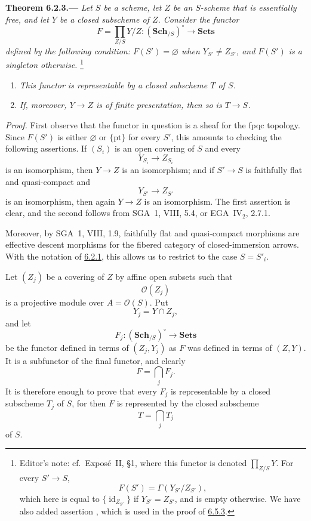 
\medskip
{}\label{thm:sga3-VIB-6.2.3}%
\noindent\textbf{Theorem 6.2.3.---}
\emph{Let \(S\) be a scheme, let \(Z\) be an \(S\)-scheme that
is essentially free, and let \(Y\) be a closed subscheme of
\(Z\). Consider the functor}
\[
  F=\prod_{Z/S}Y/Z:
  (\mathbf{Sch}_{/S})^\circ\longrightarrow\mathbf{Sets}
\]
\emph{defined by the following condition: \(F(S')=\varnothing\)
when \(Y_{S'}\ne Z_{S'}\), and \(F(S')\) is a singleton
otherwise.}%
\footnote{\label{note:sga3-VIB-55}Editor's note: cf.\
Expos\'e~II, \S1, where this functor is denoted
\(\prod_{Z/S}Y\). For every \(S'\to S\),
\[
  F(S')=\Gamma(Y_{S'}/Z_{S'}),
\]
which here is equal to
\(\{\operatorname{id}_{Z_{S'}}\}\) if
\(Y_{S'}=Z_{S'}\), and is empty otherwise. We have also added
assertion \textup{}, which is used in the proof of
\hyperref[cor:sga3-VIB-6.5.3]{6.5.3}.}
\begin{enumerate}
\item[\textup{\SGAInlineRefTarget{thm:sga3-VIB-6.2.3:item:i}(i)}]\label{concl:sga3-VIB-6.2.3-i}
  \emph{This functor is representable by a closed subscheme
  \(T\) of \(S\).}
\item[\textup{(ii)}]\label{concl:sga3-VIB-6.2.3-ii}
  \emph{If, moreover, \(Y\to Z\) is of finite presentation,
  then so is \(T\to S\).}
\end{enumerate}

\emph{Proof.}
First observe that the functor in question is a sheaf for the
fpqc topology. Since \(F(S')\) is either \(\varnothing\) or
\(\{\mathrm{pt}\}\) for every \(S'\), this amounts to checking
the following assertions. If \((S_i)\) is an open covering of
\(S\) and every
\[
  Y_{S_i}\longrightarrow Z_{S_i}
\]
is an isomorphism, then \(Y\to Z\) is an isomorphism; and if
\(S'\to S\) is faithfully flat and quasi-compact and
\[
  Y_{S'}\longrightarrow Z_{S'}
\]
is an isomorphism, then again \(Y\to Z\) is an isomorphism. The
first assertion is clear, and the second follows from SGA~1,
VIII, 5.4, or EGA~IV\(_2\), 2.7.1.

Moreover, by SGA~1, VIII, 1.9, faithfully flat and
quasi-compact morphisms are effective descent morphisms for the
fibered category of closed-immersion arrows. With the
notation of \hyperref[def:sga3-VIB-6.2.1]{6.2.1}, this allows us
to restrict to the case \(S=S'_i\).

Let \((Z_j)\) be a covering of \(Z\) by affine open subsets such
that
\[
  \mathcal O(Z_j)
\]
is a projective module over \(A=\mathcal O(S)\). Put
\[
  Y_j=Y\cap Z_j,
\]
and let
\[
  F_j:(\mathbf{Sch}_{/S})^\circ\longrightarrow\mathbf{Sets}
\]
be the functor defined in terms of \((Z_j,Y_j)\) as \(F\) was
defined in terms of \((Z,Y)\). It is a subfunctor of the final
functor, and clearly
\[
  F=\bigcap_j F_j.
\]
It is therefore enough to prove that every \(F_j\) is
representable by a closed subscheme \(T_j\) of \(S\), for then
\(F\) is represented by the closed subscheme
\[
  T=\bigcap_j T_j
\]
of \(S\).

